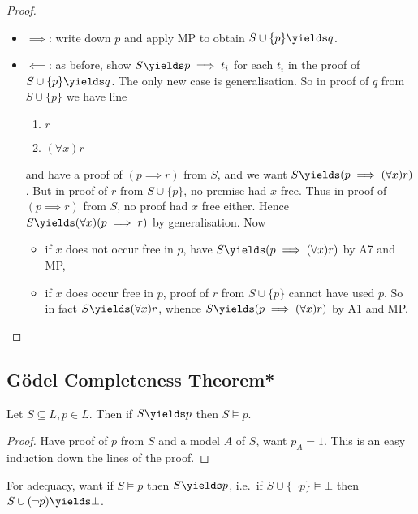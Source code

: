 \documentclass[a4paper]{article}
\begin{document}
\begin{proof}\leavevmode
  \begin{itemize}
  \item \(\implies\): write down \(p\) and apply MP to obtain \(S \cup \{p\} \yields q\).
  \item \(\impliedby\): as before, show \(S \yields p \implies t_i\) for each \(t_i\) in the proof of \(S \cup \{p\} \yields q\). The only new case is generalisation. So in proof of \(q\) from \(S \cup \{p\}\) we have line
    \begin{enumerate}
    \item \(r\)
    \item \((\forall x) r\)
    \end{enumerate}
    and have a proof of \((p \implies r)\) from \(S\), and we want \(S \yields (p \implies (\forall x) r)\). But in proof of \(r\) from \(S \cup \{p\}\), no premise had \(x\) free. Thus in proof of \((p \implies r)\) from \(S\), no proof had \(x\) free either. Hence \(S \yields (\forall x) (p \implies r)\) by generalisation. Now
    \begin{itemize}
    \item if \(x\) does not occur free in \(p\), have \(S \yields (p \implies (\forall x) r)\) by A7 and MP,
    \item if \(x\) does occur free in \(p\), proof of \(r\) from \(S \cup \{p\}\) cannot have used \(p\). So in fact \(S \yields (\forall x)r\), whence \(S \yields (p \implies (\forall x)r)\) by A1 and MP.
    \end{itemize}
  \end{itemize}
\end{proof}

\subsection{Gödel Completeness Theorem*}

\begin{proposition}[Soundness]
  Let \(S \subseteq L, p \in L\). Then if \(S \yields p\) then \(S \models p\).
\end{proposition}

\begin{proof}
  Have proof of \(p\) from \(S\) and a model \(A\) of \(S\), want \(p_A = 1\). This is an easy induction down the lines of the proof.
\end{proof}

For adequacy, want if \(S \models p\) then \(S \yields p\), i.e.\ if \(S \cup \{\neg p\} \models \bot\) then \(S \cup (\neg p) \yields \bot\).
\end{document}
